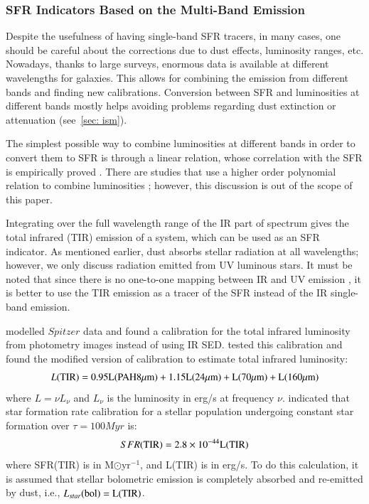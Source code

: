 \subsubsection*{SFR Indicators Based on the Multi-Band Emission}

Despite the usefulness of having single-band SFR tracers, in many cases, one should be careful about the corrections due to dust effects, luminosity ranges, etc. Nowadays, thanks to large surveys, enormous data is available at different wavelengths for galaxies. This allows for combining the emission from different bands and finding new calibrations. Conversion between SFR and luminosities at different bands mostly helps avoiding problems regarding dust extinction or attenuation (see~\ref{sec: ism}). 

The simplest possible way to combine luminosities at different bands in order to convert them to SFR is through a linear relation, whose correlation with the SFR is empirically proved \citep{Kennicutt12}. There are studies that use a higher order polynomial relation to combine luminosities \citep[e.g.,][]{Buat05}; however, this discussion is out of the scope of this paper.

Integrating over the full wavelength range of the IR part of spectrum gives the total infrared (TIR) emission of a system, which can be used as an SFR indicator. As mentioned earlier, dust absorbs stellar radiation at all wavelengths; however, we only discuss radiation emitted from UV luminous stars. It must be noted that since there is no one-to-one mapping between IR and UV emission \citep{Calzetti13}, it is better to use the TIR emission as a tracer of the SFR instead of the IR single-band emission.
 
\cite{Draine07} modelled $Spitzer$ \citep{Wener04} data and found a calibration for the total infrared luminosity from photometry images instead of using IR SED. \cite{Boquien10} tested this calibration and found the modified version of calibration to estimate total infrared luminosity: 
\begin{equation}
L(\rm TIR) = 0.95L(PAH 8 \mu m) + 1.15L(24 \mu m) + L(70 \mu m) + L(160 \mu m)
\end{equation}
where $L = \nu L_{\nu}$ and $L_{\nu}$ is the luminosity  in erg/s at frequency $\nu$. \cite{Calzetti07} indicated that star formation rate calibration for a stellar population undergoing constant star formation over $\tau=100Myr$ is:
\begin{equation}
\label{sfr_tot_IR}
SFR(\rm TIR) = 2.8 \times10^{-44}L(\rm TIR)
\end{equation}
where SFR(TIR) is in M${\odot}$yr$^{-1}$, and L(TIR) is in erg/s. To do this calculation, it is assumed that stellar bolometric emission is completely absorbed and re-emitted by dust, i.e., $L_{star}(\rm bol)=L(\rm TIR)$.

